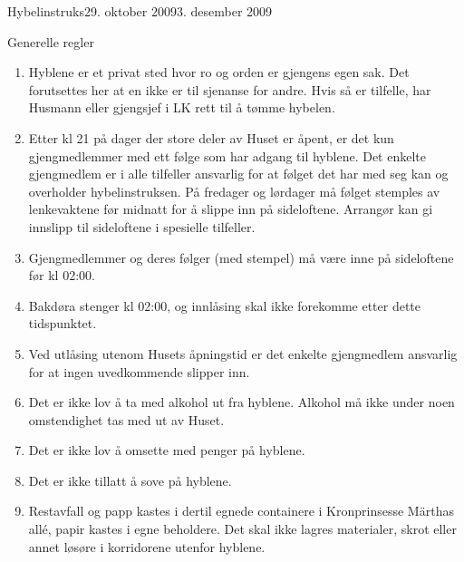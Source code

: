 \begin{instruks}{Hybelinstruks}{29. oktober 2009}{3. desember 2009}
    \begin{instruksledd}{Generelle regler}
        \begin{enumerate}
            \item Hyblene er et privat sted hvor ro og orden er gjengens egen sak. Det
                forutsettes her at en ikke er til
                sjenanse for andre. Hvis så er tilfelle, har Husmann eller gjengsjef i LK
                rett til å tømme hybelen.
            \item Etter kl 21 på dager der store deler av Huset er åpent, er det kun
                gjengmedlemmer med ett følge som har
                adgang til hyblene. Det enkelte gjengmedlem er i alle tilfeller ansvarlig
                for at følget det har med seg kan
                og overholder hybelinstruksen. På fredager og lørdager må følget stemples
                av lenkevaktene før midnatt for
                å slippe inn på sideloftene. Arrangør kan gi innslipp til sideloftene i
                spesielle tilfeller.
            \item Gjengmedlemmer og deres følger (med stempel) må være inne på sideloftene
                før kl 02:00.
            \item Bakdøra stenger kl 02:00, og innlåsing skal ikke 
forekomme etter dette
                tidspunktet.
            \item Ved utlåsing utenom Husets åpningstid er det enkelte gjengmedlem ansvarlig
                for at ingen uvedkommende slipper inn.
            \item Det er ikke lov å ta med alkohol ut fra hyblene. Alkohol må ikke under
                noen omstendighet tas med ut av Huset.
            \item Det er ikke lov å omsette med penger på hyblene.
            \item Det er ikke tillatt å sove på hyblene.
            \item Restavfall og papp kastes i dertil egnede containere i Kronprinsesse
                Märthas all\'e, papir kastes i egne
                beholdere. Det skal ikke lagres materialer, skrot eller annet løsøre i
                korridorene utenfor hyblene.
        \end{enumerate}
    \end{instruksledd}
\end{instruks}


